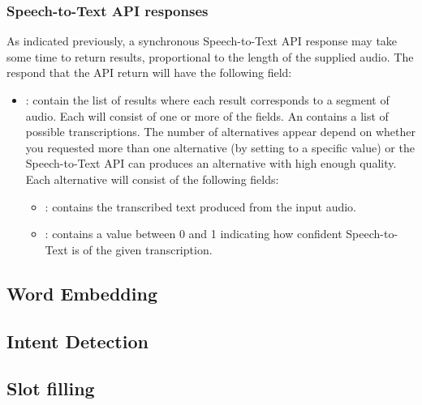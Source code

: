 \subsubsection{Speech-to-Text API responses}
As indicated previously, a synchronous Speech-to-Text API response may take some time to return results, proportional to the length of the supplied audio. The respond that the API return will have the following field:
\begin{itemize}
    \item {}: contain the list of results where each result corresponds to a segment of audio. Each will consist of one or more of the  fields. An  contains a list of possible transcriptions. The number of alternatives appear depend on whether you requested more than one alternative (by setting  to a specific value) or the Speech-to-Text API can produces an alternative with high enough quality. Each alternative will consist of the following fields: \begin{itemize}
        \item {}: contains the transcribed text produced from the input audio.
        \item {}: contains a value between 0 and 1 indicating how confident Speech-to-Text is of the given transcription.
    \end{itemize}
\end{itemize}

\subsection{Word Embedding}


\subsection{Intent Detection}

\subsection{Slot filling}
